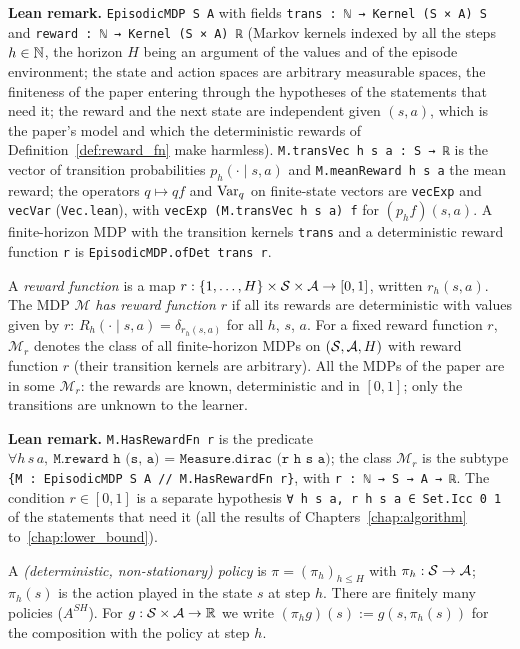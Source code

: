 \textbf{Lean remark.} \texttt{EpisodicMDP S A} with fields
\texttt{trans : ℕ → Kernel (S × A) S} and \texttt{reward : ℕ → Kernel (S × A) ℝ}
(Markov kernels indexed by all the steps $h \in \mathbb{N}$, the horizon $H$ being an argument of the
values and of the episode environment; the state and action spaces are arbitrary measurable
spaces, the finiteness of the paper entering through the hypotheses of the statements that
need it; the reward and the next state are independent given $(s, a)$, which is the
paper's model and which the deterministic rewards of Definition~\ref{def:reward_fn} make
harmless). \texttt{M.transVec h s a : S → ℝ} is the vector of transition probabilities
$p_h(\cdot \mid s, a)$ and \texttt{M.meanReward h s a} the mean reward; the operators
$q \mapsto qf$ and $\operatorname{Var}_q$ on finite-state vectors are \texttt{vecExp} and \texttt{vecVar}
(\texttt{Vec.lean}), with \texttt{vecExp (M.transVec h s a) f} for $(p_h f)(s, a)$. A
finite-horizon MDP with the transition kernels \texttt{trans} and a deterministic reward function
\texttt{r} is \texttt{EpisodicMDP.ofDet trans r}.

\begin{definition}\label{def:reward_fn}
\leanok
{}
A \emph{reward function} is a map $r : \{1, \dots, H\} \times \mathcal{S} \times \mathcal{A} \to [0, 1]$,
written $r_h(s, a)$. The MDP $\mathcal M$ \emph{has reward function $r$} if all its rewards are
deterministic with values given by $r$: $R_h(\cdot \mid s, a) = \delta_{r_h(s, a)}$ for all $h$,
$s$, $a$. For a fixed reward function $r$, $\mathcal M_r$ denotes the class of all finite-horizon
MDPs on $(\mathcal{S}, \mathcal{A}, H)$ with reward function $r$ (their transition kernels are arbitrary). All
the MDPs of the paper are in some $\mathcal M_r$: the rewards are known, deterministic and in
$[0, 1]$; only the transitions are unknown to the learner.
\end{definition}

\textbf{Lean remark.} \texttt{M.HasRewardFn r} is the predicate
$\forall h\, s\, a,\ \texttt{M.reward h (s, a) = Measure.dirac (r h s a)}$; the class
$\mathcal M_r$ is the subtype \texttt{\{M : EpisodicMDP S A // M.HasRewardFn r\}}, with
\texttt{r : ℕ → S → A → ℝ}. The
condition $r \in [0, 1]$ is a separate hypothesis \texttt{∀ h s a, r h s a ∈ Set.Icc 0 1} of
the statements that need it (all the results of Chapters~\ref{chap:algorithm}
to~\ref{chap:lower_bound}).

\begin{definition}\label{def:policy}
\leanok
{}
A \emph{(deterministic, non-stationary) policy} is $\pi = (\pi_h)_{h \le H}$ with
$\pi_h : \mathcal{S} \to \mathcal{A}$; $\pi_h(s)$ is the action played in the state $s$ at step $h$. There are
finitely many policies ($A^{SH}$). For $g : \mathcal{S} \times \mathcal{A} \to \mathbb{R}$ we write
$(\pi_h g)(s) := g(s, \pi_h(s))$ for the composition with the policy at step $h$.
\end{definition}

